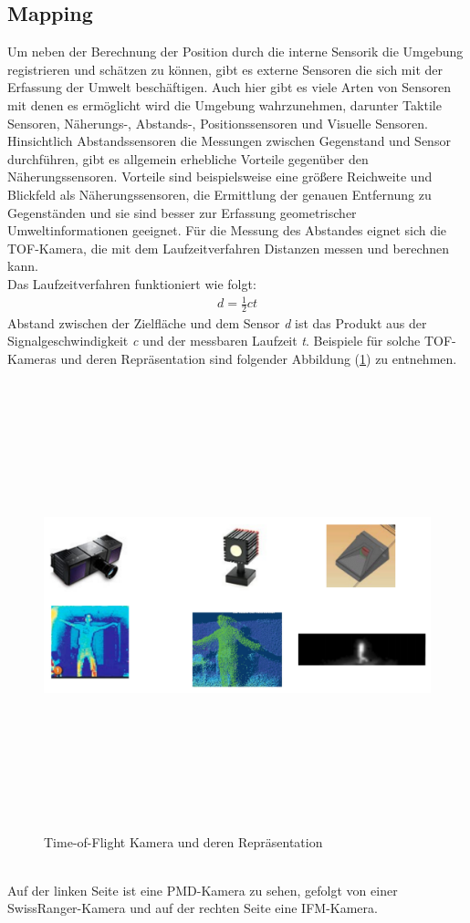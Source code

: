 \subsection{Mapping}
Um neben der Berechnung der Position durch die interne Sensorik die Umgebung registrieren und schätzen zu können, gibt es externe Sensoren 
die sich mit der Erfassung der Umwelt beschäftigen. Auch hier gibt es viele Arten von Sensoren mit denen es ermöglicht wird die Umgebung 
wahrzunehmen, darunter Taktile Sensoren, Näherungs-, Abstands-, Positionssensoren und Visuelle Sensoren. Hinsichtlich Abstandssensoren die 
Messungen zwischen Gegenstand und Sensor durchführen, gibt es allgemein erhebliche Vorteile gegenüber den Näherungssensoren. Vorteile sind 
beispielsweise eine größere Reichweite und Blickfeld als Näherungssensoren, die Ermittlung der genauen Entfernung zu Gegenständen und sie 
sind besser zur Erfassung geometrischer Umweltinformationen geeignet. Für die Messung des Abstandes eignet sich die \ac{TOF}-Kamera, die 
mit dem Laufzeitverfahren Distanzen messen und berechnen kann. 
\\ 
Das Laufzeitverfahren funktioniert wie folgt:
\begin{align*}
    \textit{d} = \frac{1}{2}\textit{ct}
\end{align*}
Abstand zwischen der Zielfläche und dem Sensor \textit{d} ist das Produkt aus der Signalgeschwindigkeit \textit{c} und der messbaren Laufzeit 
\textit{t}. Beispiele für solche \acs{TOF}-Kameras und deren Repräsentation sind folgender Abbildung (\ref{pic:tofCam}) zu entnehmen.
\begin{figure}[hbt!]
    \centering
    \includegraphics[width=13cm,height=13cm,keepaspectratio]{2Grundlagen/Bilder/tof_kamera.png}
    \caption{Time-of-Flight Kamera und deren Repräsentation \cite{robotik.2020m}}
    \label{pic:tofCam}
\end{figure}
\\ 
Auf der linken Seite ist eine PMD-Kamera zu sehen, gefolgt von einer SwissRanger-Kamera und auf der rechten Seite eine IFM-Kamera.


